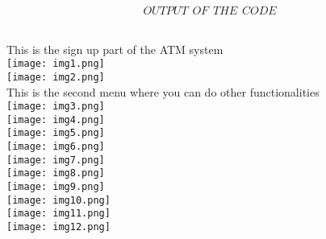 \documentclass[11pt]{article}
\begin{document}
 $$OUTPUT \hspace{5pt} OF \hspace{5pt} THE \hspace{5pt} CODE$$ \\
\begin{center}
\large{This is the sign up part of the ATM system}\\
\texttt{[image: img1.png]}\\
\texttt{[image: img2.png]}\\
\large{This is the second menu where you can do other functionalities}\\
\texttt{[image: img3.png]}\\
\texttt{[image: img4.png]}\\
\texttt{[image: img5.png]}\\
\texttt{[image: img6.png]}\\
\texttt{[image: img7.png]}\\
\texttt{[image: img8.png]}\\
\texttt{[image: img9.png]}\\
\texttt{[image: img10.png]}\\
\texttt{[image: img11.png]}\\
\texttt{[image: img12.png]}\\
\end{center}
\end{document}
